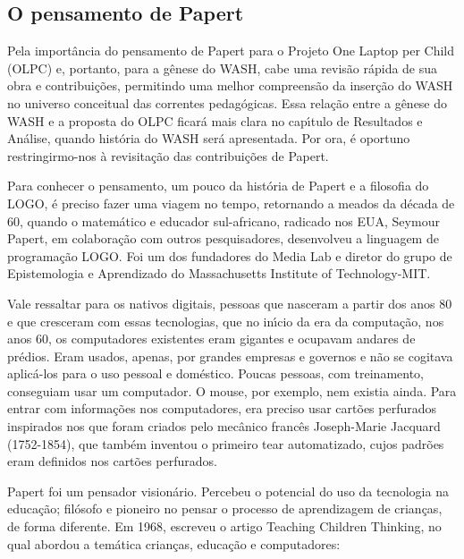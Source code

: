 \documentclass[
12pt,		%
openright,	%
twoside,  %
a4paper,			%
chapter=TITLE,		%
english,			%
french,				%
spanish,			%
brazil				%
]{USPSC-classe/USPSC}
\begin{document}
\subsection[O pensamento de Papert]{O pensamento de Papert}\label{O pensamento de Papert}
Pela import\^ancia do pensamento de Papert para o Projeto One Laptop per Child (OLPC) e, portanto, para a g\^enese do WASH, cabe uma revis\~ao r\'apida de sua obra e contribui\c{c}\~oes, permitindo uma melhor compreens\~ao da inser\c{c}\~ao do WASH no universo conceitual das correntes pedag\'ogicas. Essa rela\c{c}\~ao entre a g\^enese do WASH e a proposta do OLPC ficar\'a mais clara no cap\'{\i}tulo de Resultados e An\'alise, quando hist\'oria do WASH ser\'a apresentada. Por ora, \'e oportuno restringirmo-nos \`a revisita\c{c}\~ao das contribui\c{c}\~oes de Papert.




Para conhecer  o pensamento, um pouco da hist\'oria de Papert e  a filosofia do LOGO, \'e preciso fazer uma viagem no tempo, retornando a meados da d\'ecada de 60, quando o matem\'atico e educador sul-africano, radicado nos EUA, Seymour Papert, em colabora\c{c}\~ao com outros pesquisadores, desenvolveu a linguagem  de programa\c{c}\~ao LOGO.  Foi um dos fundadores do Media Lab e diretor do grupo de Epistemologia e Aprendizado do Massachusetts Institute of Technology-MIT.




Vale ressaltar para os nativos digitais, pessoas que nasceram a partir dos anos 80 e que cresceram com essas tecnologias, que no in\'{\i}cio da era da computa\c{c}\~ao, nos anos 60, os computadores existentes eram gigantes e ocupavam andares de pr\'edios. Eram usados, apenas, por grandes empresas e governos e n\~ao se cogitava aplic\'a-los para o uso pessoal e dom\'estico. Poucas pessoas, com treinamento, conseguiam usar um computador. O mouse, por exemplo, nem existia ainda. Para entrar com informa\c{c}\~oes nos computadores, era preciso usar cart\~oes perfurados inspirados nos que foram criados pelo mec\^anico franc\^es Joseph-Marie Jacquard (1752-1854), que tamb\'em inventou o primeiro tear automatizado, cujos padr\~oes eram definidos nos cart\~oes perfurados.




Papert foi um pensador vision\'ario. Percebeu o potencial do uso da tecnologia na educa\c{c}\~ao; fil\'osofo e pioneiro no pensar o processo de aprendizagem de crian\c{c}as, de forma diferente. Em 1968, escreveu o artigo \textquotedbl Teaching Children Thinking\textquotedbl , no qual abordou a tem\'atica crian\c{c}as, educa\c{c}\~ao e computadores:
\end{document}
